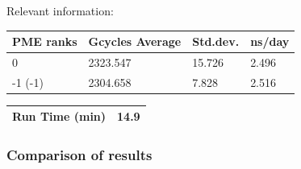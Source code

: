 Relevant information:
\begin{center}
    \begin{tabular}{|p{3.5cm}|p{3.5cm}|p{3.5cm}|p{3.5cm}|} \hline
         PME ranks & Gcycles Average & Std.dev. & ns/day \\ \hline
         0 & 2323.547  & 15.726  & 2.496  \\ \hline
         -1 (-1) & 2304.658 & 7.828 & 2.516  \\ \hline
    \end{tabular}
     \begin{tabular}{|p{3.5cm}|p{11.4cm}|} \hline
         Run Time (min) & 14.9 \\ \hline
    \end{tabular}
\end{center}

\subsubsection{Comparison of results}

